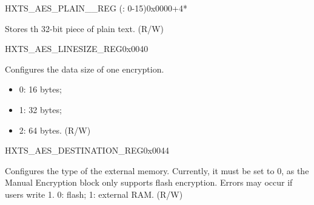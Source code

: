 

\begin{register}{H}{XTS\_AES\_PLAIN\_\_REG (: 0-15)}{0x{}0000+4*}\label{regdesc:XTSAESPLAINNREG}
%
\regnewline%
\begin{regdesc}\begin{reglist}
\label{fielddesc:XTSAESPLAINN}\item [XTS\_AES\_PLAIN\_\regindex{n}] Stores th 32-bit piece of plain text. (R/W)
\end{reglist}\end{regdesc}
\end{register}



\begin{register}{H}{XTS\_AES\_LINESIZE\_REG}{0x{}0040}\label{regdesc:XTSAESLINESIZEREG}
%
%
\regnewline%
\begin{regdesc}\begin{reglist}
\item [XTS\_AES\_LINESIZE] Configures the data size of one encryption. 
    \begin{itemize}
        \item 0: 16 bytes;
        \item 1: 32 bytes;
        \item 2: 64 bytes. (R/W)
    \end{itemize}
\end{reglist}\end{regdesc}
\end{register}


\begin{register}{H}{XTS\_AES\_DESTINATION\_REG}{0x{}0044}\label{regdesc:XTSAESDESTINATIONREG}
%
%
\regnewline%
\begin{regdesc}\begin{reglist}
\item [XTS\_AES\_DESTINATION] Configures the type of the external memory. Currently, it must be set to 0, as the Manual Encryption block only supports flash encryption. Errors may occur if users write 1. 0: flash; 1: external RAM. (R/W)

\end{reglist}\end{regdesc}
\end{register}



